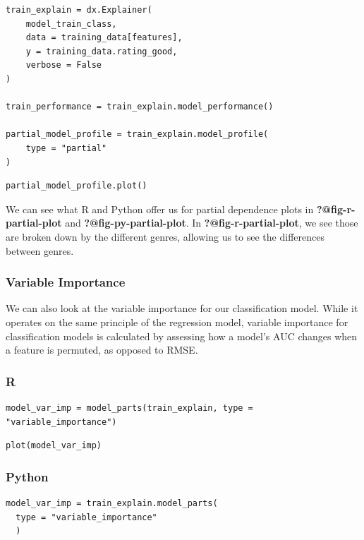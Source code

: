\documentclass[
  letterpaper,
]{krantz}
\begin{document}
\begin{verbatim}
train_explain = dx.Explainer(
    model_train_class, 
    data = training_data[features], 
    y = training_data.rating_good, 
    verbose = False
)

train_performance = train_explain.model_performance()

partial_model_profile = train_explain.model_profile(
    type = "partial"
)
\end{verbatim}

\begin{verbatim}
partial_model_profile.plot()
\end{verbatim}

We can see what R and Python offer us for partial dependence plots in
\textbf{?@fig-r-partial-plot} and \textbf{?@fig-py-partial-plot}. In
\textbf{?@fig-r-partial-plot}, we see those are broken down by the
different genres, allowing us to see the differences between genres.

\subsubsection{Variable Importance}\label{variable-importance-1}

We can also look at the variable importance for our classification
model. While it operates on the same principle of the regression model,
variable importance for classification models is calculated by assessing
how a model's AUC changes when a feature is permuted, as opposed to
RMSE.

\subsubsection{R}

\begin{verbatim}
model_var_imp = model_parts(train_explain, type = "variable_importance")
\end{verbatim}

\begin{verbatim}
plot(model_var_imp)
\end{verbatim}

\subsubsection{Python}

\begin{verbatim}
model_var_imp = train_explain.model_parts(
  type = "variable_importance"
  )
\end{verbatim}
\end{document}
